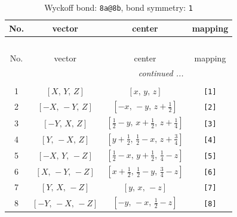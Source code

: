 \documentclass[fleqn,8pt]{jsarticle}
\begin{document}
\begin{longtable}{cccc}
\caption{Wyckoff bond: {\tt 8a@8b}, bond symmetry: {\tt 1}}
 \\
 \hline \hline
No. & vector & center & mapping \\ \hline \endfirsthead

\multicolumn{3}{l}{\tablename\ \thetable{}} \\
 \hline \hline
No. & vector & center & mapping \\ \hline \endhead

 \hline \hline
\multicolumn{3}{r}{\footnotesize\it continued ...} \\ \endfoot

 \hline \hline
\multicolumn{3}{r}{} \\ \endlastfoot

1 & $\left[ X,\, Y,\, Z \right]$ & $\left[ x,\, y,\, z \right]$ & {\tt [1]} \\ \hline
2 & $\left[ - X,\, - Y,\, Z \right]$ & $\left[ - x,\, - y,\, z + \frac{1}{2} \right]$ & {\tt [2]} \\ \hline
3 & $\left[ - Y,\, X,\, Z \right]$ & $\left[ \frac{1}{2} - y,\, x + \frac{1}{2},\, z + \frac{1}{4} \right]$ & {\tt [3]} \\ \hline
4 & $\left[ Y,\, - X,\, Z \right]$ & $\left[ y + \frac{1}{2},\, \frac{1}{2} - x,\, z + \frac{3}{4} \right]$ & {\tt [4]} \\ \hline
5 & $\left[ - X,\, Y,\, - Z \right]$ & $\left[ \frac{1}{2} - x,\, y + \frac{1}{2},\, \frac{1}{4} - z \right]$ & {\tt [5]} \\ \hline
6 & $\left[ X,\, - Y,\, - Z \right]$ & $\left[ x + \frac{1}{2},\, \frac{1}{2} - y,\, \frac{3}{4} - z \right]$ & {\tt [6]} \\ \hline
7 & $\left[ Y,\, X,\, - Z \right]$ & $\left[ y,\, x,\, - z \right]$ & {\tt [7]} \\ \hline
8 & $\left[ - Y,\, - X,\, - Z \right]$ & $\left[ - y,\, - x,\, \frac{1}{2} - z \right]$ & {\tt [8]} \\
\end{longtable}
\end{document}
